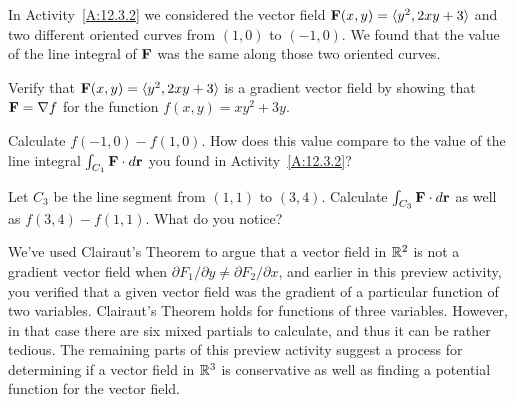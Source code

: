 \begin{pa} \label{PA:12.4}

In Activity~\ref{A:12.3.2} we considered the vector field $\mathbf{F}(x,y) =
\langle y^2,2xy+3\rangle$ and two different oriented curves from
$(1,0)$ to $(-1,0)$. We found that the value of the line integral of
$\mathbf{F}$ was the same along those two oriented curves.
\ba
\item Verify that $\mathbf{F}(x,y) = \langle y^2,2xy+3\rangle$ is a gradient
  vector field by showing that $\mathbf{F} = \nabla f$ for the function
  $f(x,y) = xy^2 + 3y$.
\item Calculate $f(-1,0)-f(1,0)$. How does this value compare to the
  value of the line integral $\int_{C_1}\mathbf{F}\cdot d\mathbf{r}$ you found in
  Activity~\ref{A:12.3.2}?
\item Let $C_3$ be the line segment from $(1,1)$ to $(3,4)$. Calculate
  $\int_{C_3}\mathbf{F}\cdot d\mathbf{r}$ as well as $f(3,4)-f(1,1)$. What do you
  notice?
\saveCount
\ea

We've used Clairaut's Theorem to argue that a vector field in $\mathbb{R}^2$
is not a gradient vector field when $\partial F_1/\partial
y\neq \partial F_2/\partial x$, and earlier in this preview activity,
you verified that a given vector field was the gradient of a
particular function of two variables. Clairaut's Theorem holds for
functions of three variables. However, in that case there are six mixed partials to
calculate, and thus it can be rather tedious. The remaining parts of
this preview activity suggest a process for determining if a vector
field in $\mathbb{R}^3$ is conservative as well as finding a potential
function for the vector field.


\end{pa}
